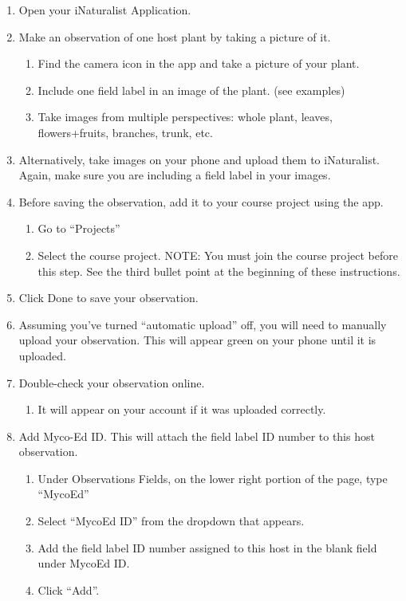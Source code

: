 \documentclass[
  letterpaper,
  DIV=11,
  numbers=noendperiod]{scrreprt}
\providecommand{\tightlist}{%
  \setlength{\itemsep}{0pt}\setlength{\parskip}{0pt}}
\begin{document}
\begin{enumerate}
\def\labelenumi{\arabic{enumi}.}
\tightlist
\item
  Open your iNaturalist Application.
\item
  Make an observation of one host plant by taking a picture of it.

  \begin{enumerate}
  \def\labelenumii{\alph{enumii}.}
  \tightlist
  \item
    Find the camera icon in the app and take a picture of your plant.
  \item
    Include one field label in an image of the plant. (see examples)
  \item
    Take images from multiple perspectives: whole plant, leaves,
    flowers+fruits, branches, trunk, etc.
  \end{enumerate}
\item
  Alternatively, take images on your phone and upload them to
  iNaturalist. Again, make sure you are including a field label in your
  images.
\item
  Before saving the observation, add it to your course project using the
  app.

  \begin{enumerate}
  \def\labelenumii{\alph{enumii}.}
  \tightlist
  \item
    Go to ``Projects''
  \item
    Select the course project. NOTE: You must join the course project
    before this step. See the third bullet point at the beginning of
    these instructions.
  \end{enumerate}
\item
  Click Done to save your observation.
\item
  Assuming you've turned ``automatic upload'' off, you will need to
  manually upload your observation. This will appear green on your phone
  until it is uploaded.
\item
  Double-check your observation online.

  \begin{enumerate}
  \def\labelenumii{\alph{enumii}.}
  \tightlist
  \item
    It will appear on your account if it was uploaded correctly.
  \end{enumerate}
\item
  Add Myco-Ed ID. This will attach the field label ID number to this
  host observation.

  \begin{enumerate}
  \def\labelenumii{\alph{enumii}.}
  \tightlist
  \item
    Under Observations Fields, on the lower right portion of the page,
    type ``MycoEd''
  \item
    Select ``MycoEd ID'' from the dropdown that appears.
  \item
    Add the field label ID number assigned to this host in the blank
    field under MycoEd ID.
  \item
    Click ``Add''.
  \end{enumerate}
\end{enumerate}
\end{document}
